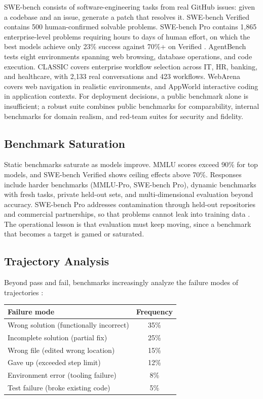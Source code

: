 \documentclass[11pt]{book}
\begin{document}
SWE-bench \cite{swebench2024} consists of software-engineering tasks from real GitHub issues: given a codebase and an issue, generate a patch that resolves it. SWE-bench Verified contains 500 human-confirmed solvable problems. SWE-bench Pro contains 1{,}865 enterprise-level problems requiring hours to days of human effort, on which the best models achieve only 23\% success against 70\%+ on Verified \cite{swebenchpro2025}. AgentBench \cite{agentbench2023} tests eight environments spanning web browsing, database operations, and code execution. CLASSIC \cite{classic2025} covers enterprise workflow selection across IT, HR, banking, and healthcare, with 2{,}133 real conversations and 423 workflows. WebArena covers web navigation in realistic environments, and AppWorld interactive coding in application contexts. For deployment decisions, a public benchmark alone is insufficient; a robust suite combines public benchmarks for comparability, internal benchmarks for domain realism, and red-team suites for security and fidelity.

\subsection{Benchmark Saturation}

Static benchmarks saturate as models improve. MMLU scores exceed 90\% for top models, and SWE-bench Verified shows ceiling effects above 70\%. Responses include harder benchmarks (MMLU-Pro, SWE-bench Pro), dynamic benchmarks with fresh tasks, private held-out sets, and multi-dimensional evaluation beyond accuracy. SWE-bench Pro addresses contamination through held-out repositories and commercial partnerships, so that problems cannot leak into training data \cite{swebenchpro2025}. The operational lesson is that evaluation must keep moving, since a benchmark that becomes a target is gamed or saturated.

\subsection{Trajectory Analysis}

Beyond pass and fail, benchmarks increasingly analyze the failure modes of trajectories \cite{swebenchpro2025}:

\begin{center}
\begin{tabular}{lc}
\toprule
Failure mode & Frequency \\
\midrule
Wrong solution (functionally incorrect) & 35\% \\
Incomplete solution (partial fix) & 25\% \\
Wrong file (edited wrong location) & 15\% \\
Gave up (exceeded step limit) & 12\% \\
Environment error (tooling failure) & 8\% \\
Test failure (broke existing code) & 5\% \\
\bottomrule
\end{tabular}
\end{center}
\end{document}
